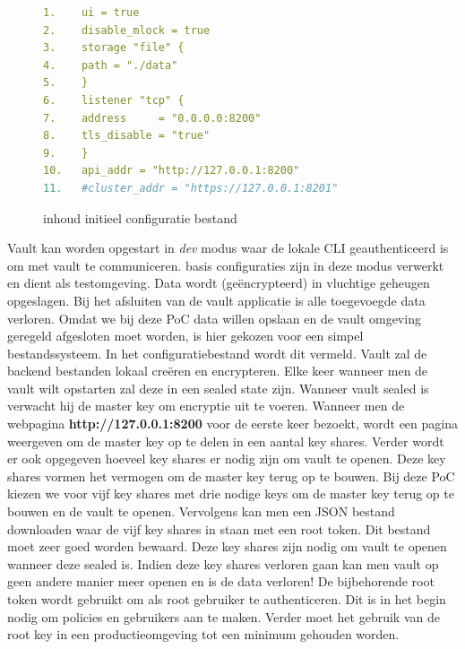 \begin{figure}[hbtp]
    \caption{inhoud initieel configuratie bestand}
    \begin{lstlisting}[language=yaml,frame=single]
1.    ui = true
2.    disable_mlock = true
3.    storage "file" {
4.    path = "./data"
5.    }
6.    listener "tcp" {
7.    address     = "0.0.0.0:8200"
8.    tls_disable = "true"
9.    }
10.   api_addr = "http://127.0.0.1:8200"
11.   #cluster_addr = "https://127.0.0.1:8201"
    \end{lstlisting}
\end{figure}
Vault kan worden opgestart in \textit{dev} modus waar de lokale CLI geauthenticeerd is om met vault te communiceren. basis configuraties zijn in deze modus verwerkt en dient als testomgeving. Data wordt (geëncrypteerd) in vluchtige geheugen opgeslagen. Bij het afsluiten van de vault applicatie is alle toegevoegde data verloren. Omdat we bij deze PoC data willen opslaan en de vault omgeving geregeld afgesloten moet worden, is hier gekozen voor een simpel bestandssysteem. In het configuratiebestand wordt dit vermeld. Vault zal de backend bestanden lokaal creëren en encrypteren. Elke keer wanneer men de vault wilt opstarten zal deze in een sealed state zijn. Wanneer vault sealed is verwacht hij de master key om encryptie uit te voeren. Wanneer men de webpagina \textbf{http://127.0.0.1:8200} voor de eerste keer bezoekt, wordt een pagina weergeven om de master key op te delen in een aantal key shares. Verder wordt er ook opgegeven hoeveel key shares er nodig zijn om vault te openen. Deze key shares vormen het vermogen om de master key terug op te bouwen. Bij deze PoC kiezen we voor vijf key shares met drie nodige keys om de master key terug op te bouwen en de vault te openen. Vervolgens kan men een JSON bestand downloaden waar de vijf key shares in staan met een root token. Dit bestand moet zeer goed worden bewaard. Deze key shares zijn nodig om vault te openen wanneer deze sealed is. Indien deze key shares verloren gaan kan men vault op geen andere manier meer openen en is de data verloren! De bijbehorende root token wordt gebruikt om als root gebruiker te authenticeren. Dit is in het begin nodig om policies en gebruikers aan te maken. Verder moet het gebruik van de root key in een productieomgeving tot een minimum gehouden worden.

